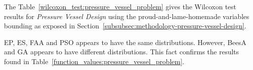 
The Table~\ref{wilcoxon_test:pressure_vessel_problem} gives the Wilcoxon test results
for \textit{Pressure Vessel Design} using the proud-and-lame-homemade variables bounding
as exposed in Section~\ref{subsubsec:methodology-pressure-vessel-design}.


\begin{table}[H]
\centering
\caption{Significance Test Using Wilcoxon Test for Pressure Vessel Design}
\label{wilcoxon_test:pressure_vessel_problem}
\end{table}

EP, ES, FAA and PSO appears to have the same distributions.
However, BeesA and GA appears to have different distributions.
This fact confirms the results found in Table~\ref{function_values:pressure_vessel_problem}.

